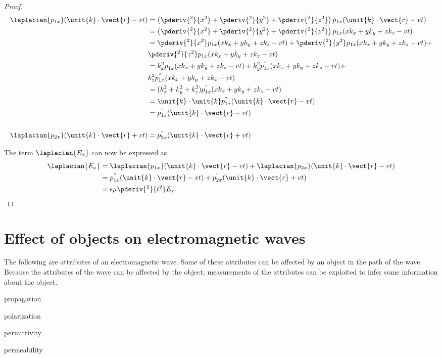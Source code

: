 \begin{proof}
\begin{align*}
   \laplacian{p_{1x}}(\unit{k}\cdot \vect{r} - vt)
   &= 
   \left( \pderiv{^2}{x^2}+\pderiv{^2}{y^2}+\pderiv{^2}{z^2}\right)
   p_{1x}(\unit{k}\cdot \vect{r} - vt)
   \\&= 
   \left( \pderiv{^2}{x^2}+\pderiv{^2}{y^2}+\pderiv{^2}{z^2}\right)
   p_{1x}(xk_x + yk_y + zk_z - vt)
   \\&= 
   \pderiv{^2}{x^2}p_{1x}(xk_x + yk_y + zk_z - vt) +
   \pderiv{^2}{y^2}p_{1x}(xk_x + yk_y + zk_z - vt) +
   \\& 
   \pderiv{^2}{z^2}p_{1x}(xk_x + yk_y + zk_z - vt)
   \\&= 
   k_x^2 p^"_{1x}(xk_x + yk_y + zk_z - vt) +
   k_y^2 p^"_{1x}(xk_x + yk_y + zk_z - vt) +
   \\& 
   k_z^2 p^"_{1x}(xk_x + yk_y + zk_z - vt)
   \\&= 
   (k_x^2 + k_y^2 + k_z^2)p^"_{1x}(xk_x + yk_y + zk_z - vt)
   \\&= 
   \unit{k}\cdot\unit{k}p^"_{1x}(\unit{k}\cdot \vect{r} - vt)
   \\&= 
   p^"_{1x}(\unit{k}\cdot \vect{r} - vt)
   \\ \\
   \laplacian{p_{2x}}(\unit{k}\cdot \vect{r} + vt)
   &= 
   p^"_{2x}(\unit{k}\cdot \vect{r} + vt)
\end{align*}

The term $\laplacian{E_x}$ can now be expressed as
\begin{align*}
   \laplacian{E_x}
   &= 
   \laplacian{p_{1x}}(\unit{k}\cdot \vect{r} - vt) +
   \laplacian{p_{2x}}(\unit{k}\cdot \vect{r} - vt)
   \\&= 
   p^"_{1x}(\unit{k}\cdot \vect{r} - vt) +
   p^"_{2x}(\unit{k}\cdot \vect{r} + vt)
   \\&= 
   \epsilon\mu \pderiv{^2}{t^2}E_x.
\end{align*}
\end{proof}

\section{Effect of objects on electromagnetic waves}
\label{sec_effects}
The following are attributes of an electromagnetic wave.
Some of these attributes can be affected by an object in the path of the wave.
Because the attributes of the wave can be affected by the object,
measurements of the attributes can be exploited
to infer some information about the object.
\begin{liste}
   \item propagation
   \item polarization
   \item permittivity
   \item permeability
\end{liste}

